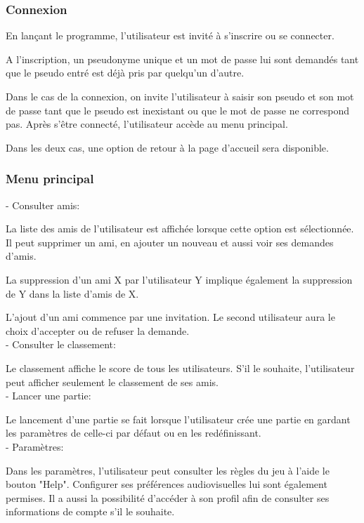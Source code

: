 \documentclass[a4paper,12pt]{article}
\begin{document}
\subsubsection{Connexion}
En lançant le programme, l'utilisateur est invité à s'inscrire ou se connecter.

A l'inscription, un pseudonyme unique et un mot de passe lui sont demandés tant que le pseudo entré est déjà pris par quelqu'un d'autre.

Dans le cas de la connexion, on invite l'utilisateur à saisir son pseudo et son mot de passe tant que le pseudo est inexistant ou que le mot de passe ne correspond pas. Après s’être connecté, l'utilisateur accède au menu principal.

Dans les deux cas, une option de retour à la page d'accueil sera disponible.

\subsubsection{Menu principal}

- Consulter amis:

La liste des amis de l'utilisateur est affichée lorsque cette option est sélectionnée. Il peut supprimer un ami, en ajouter un nouveau et aussi voir ses demandes d'amis. 

La suppression d'un ami X par l'utilisateur Y implique également la suppression de Y dans la liste d'amis de X. 

L'ajout d'un ami commence par une invitation. Le second utilisateur aura le choix d'accepter ou de refuser la demande. \\

- Consulter le classement:

Le classement affiche le score de tous les utilisateurs. S'il le souhaite, l'utilisateur peut afficher seulement le classement de ses amis. \\

- Lancer une partie:

Le lancement d’une partie se fait lorsque l’utilisateur crée une partie en gardant les paramètres de celle-ci par défaut ou en les redéfinissant. \\

- Paramètres:

Dans les paramètres, l'utilisateur peut consulter les règles du jeu à l'aide le bouton "Help". Configurer ses préférences audiovisuelles lui sont également permises. Il a aussi la possibilité d'accéder à son profil afin de consulter ses informations de compte s'il le souhaite.
\end{document}
